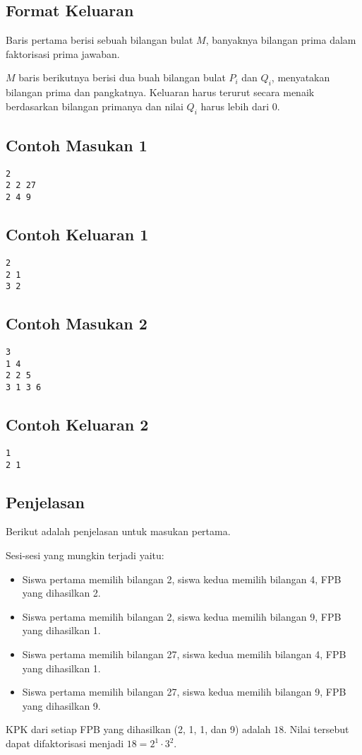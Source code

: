 \documentclass{article}
\begin{document}
\subsection*{Format Keluaran}
\par\noindent 
Baris pertama berisi sebuah bilangan bulat $M$, banyaknya bilangan prima dalam faktorisasi prima jawaban.
\newline
\par\noindent 
$M$ baris berikutnya berisi dua buah bilangan bulat $P_i$ dan $Q_i$, menyatakan bilangan prima dan pangkatnya. Keluaran harus terurut secara menaik berdasarkan bilangan primanya dan nilai $Q_i$ harus lebih dari $0$.

\subsection*{Contoh Masukan 1}
\begin{lstlisting}
2
2 2 27
2 4 9
\end{lstlisting}
\subsection*{Contoh Keluaran 1}
\begin{lstlisting}
2
2 1
3 2
\end{lstlisting}

\subsection*{Contoh Masukan 2}
\begin{lstlisting}
3
1 4
2 2 5
3 1 3 6
\end{lstlisting}
\subsection*{Contoh Keluaran 2}
\begin{lstlisting}
1
2 1
\end{lstlisting}


\subsection*{Penjelasan}
\par\noindent 
Berikut adalah penjelasan untuk masukan pertama.
\newline
\par\noindent 
Sesi-sesi yang mungkin terjadi yaitu:
\begin{itemize}
\item Siswa pertama memilih bilangan 2, siswa kedua memilih bilangan 4, FPB yang dihasilkan 2.
\item Siswa pertama memilih bilangan 2, siswa kedua memilih bilangan 9, FPB yang dihasilkan 1.
\item Siswa pertama memilih bilangan 27, siswa kedua memilih bilangan 4, FPB yang dihasilkan 1.
\item Siswa pertama memilih bilangan 27, siswa kedua memilih bilangan 9, FPB yang dihasilkan 9.
\end{itemize}
\par\noindent 
KPK dari setiap FPB yang dihasilkan (2, 1, 1, dan 9) adalah $18$. Nilai tersebut dapat difaktorisasi menjadi $18 = 2^1 \cdot 3^2$.
\end{document}

